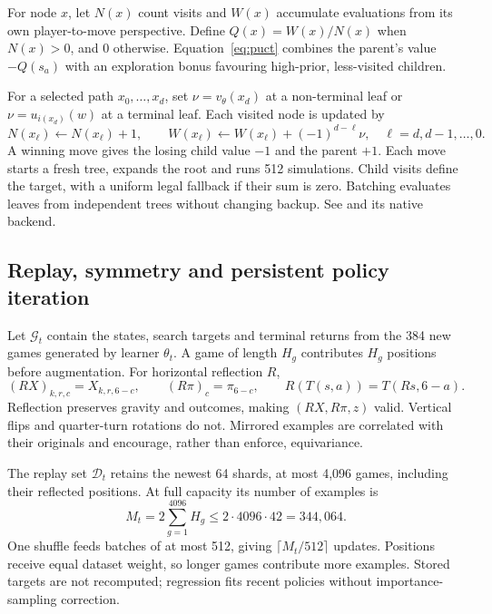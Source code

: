 \documentclass[letterpaper]{article}
\begin{document}
For node $x$, let $N(x)$ count visits and $W(x)$ accumulate evaluations from its
own player-to-move perspective. Define $Q(x)=W(x)/N(x)$ when $N(x)>0$, and $0$
otherwise. Equation~\eqref{eq:puct} combines the parent's value $-Q(s_a)$ with
an exploration bonus favouring high-prior, less-visited children.

For a selected path $x_0,\ldots,x_d$, set
$\nu=v_\theta(x_d)$ at a non-terminal leaf or
$\nu=u_{i(x_d)}(w)$ at a terminal leaf. Each visited node is updated by
\begin{equation}
 N(x_\ell)\leftarrow N(x_\ell)+1,\qquad
 W(x_\ell)\leftarrow W(x_\ell)+(-1)^{d-\ell}\nu,
 \quad \ell=d,d-1,\ldots,0.
 \label{eq:backup}
\end{equation}
A winning move gives the losing child value $-1$ and the parent $+1$.
Each move starts a fresh tree, expands the root and runs 512 simulations.
Child visits define the target, with a uniform legal fallback if their sum is zero.
Batching evaluates leaves from independent trees without changing backup.
See  and its native backend.

\subsection{Replay, symmetry and persistent policy iteration}
\label{app:replay-math}
Let $\mathcal G_t$ contain the states, search targets and terminal returns from
the 384 new games generated by learner $\theta_t$. A game of length $H_g$
contributes $H_g$ positions before augmentation. For horizontal reflection $R$,
\begin{equation}
 (RX)_{k,r,c}=X_{k,r,6-c},\qquad
 (R\pi)_c=\pi_{6-c},\qquad
 R(T(s,a))=T(Rs,6-a).
 \label{eq:reflection}
\end{equation}
Reflection preserves gravity and outcomes, making $(RX,R\pi,z)$ valid.
Vertical flips and quarter-turn rotations do not. Mirrored examples are correlated
with their originals and encourage, rather than enforce, equivariance.

The replay set $\mathcal D_t$ retains the newest 64 shards, at most 4,096 games,
including their reflected positions. At full capacity its number of examples is
\begin{equation}
 M_t=2\sum_{g=1}^{4096}H_g\leq2\cdot4096\cdot42=344{,}064.
 \label{eq:replay-size}
\end{equation}
One shuffle feeds batches of at most 512, giving $\lceil M_t/512\rceil$ updates.
Positions receive equal dataset weight, so longer games contribute more examples.
Stored targets are not recomputed; regression fits recent policies without
importance-sampling correction.
\end{document}
